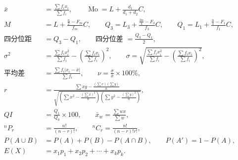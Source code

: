 \documentclass[12pt,a4paper]{exam-zh}
\newcommand{\formulasection}[1]{\vspace{0.6em}{\bfseries #1}\par}
\begin{document}
\formulasection{IV. 统计与概率}
\begin{align*}
\bar x&=\frac{\sum f_i x_i}{\sum f_i},\qquad \operatorname{Mo}=L+\frac{d_1}{d_1+d_2}C, \\
M&=L+\frac{\frac n2-F_m}{f_m}C,\qquad Q_3=L_3+\frac{\frac{3n}{4}-F_3}{f_3}C,\qquad Q_1=L_1+\frac{\frac n4-F_1}{f_1}C, \\
\text{四分位距 }&=Q_3-Q_1,\qquad \text{四分位差 }=\frac{Q_3-Q_1}{2}, \\
\sigma^2&=\frac{\sum f_i x_i^2}{\sum f_i}-\left(\frac{\sum f_i x_i}{\sum f_i}\right)^2,\qquad
\sigma=\sqrt{\frac{\sum f_i x_i^2}{\sum f_i}-\left(\frac{\sum f_i x_i}{\sum f_i}\right)^2}, \\
\text{平均差 }&=\frac{\sum f_i|x_i-\bar x|}{\sum f_i},\qquad \nu=\frac{\sigma}{\bar x}\times100\%, \\
r&=\frac{\sum xy-\frac{(\sum x)(\sum y)}{n}}{\sqrt{\left(\sum x^2-\frac{(\sum x)^2}{n}\right)\left(\sum y^2-\frac{(\sum y)^2}{n}\right)}}, \\
QI&=\frac{Q_1}{Q_0}\times100,\qquad \bar x_w=\frac{\sum wx}{\sum w}, \\
{}^nP_r&=\frac{n!}{(n-r)!},\qquad {}^nC_r=\frac{n!}{(n-r)!r!}, \\
P(A\cup B)&=P(A)+P(B)-P(A\cap B),\qquad P(A')=1-P(A), \\
E(X)&=x_1p_1+x_2p_2+\cdots+x_kp_k.
\end{align*}

\newpage
\end{document}

